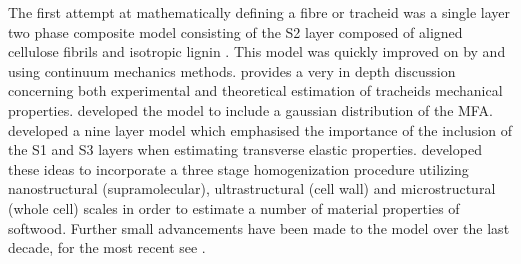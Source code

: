  The first attempt at mathematically defining a fibre or tracheid was a single layer two phase composite model consisting of the S2 layer composed of aligned cellulose fibrils and isotropic lignin \cite{Barber_1964}. This model was quickly improved on by \cite{mark1967cell} and \cite{Cave_1968} using continuum mechanics methods. \cite{mark1967cell} provides a very in depth discussion concerning both experimental and theoretical estimation of tracheids mechanical properties. \cite{Cave_1968} developed the model to include a gaussian distribution of the MFA. \cite{bergander2002cell} developed a nine layer model which emphasised the importance of the inclusion of the S1 and S3 layers when estimating transverse elastic properties. \cite{harrington2002hierarchical} developed these ideas to incorporate a three stage homogenization procedure utilizing nanostructural (supramolecular), ultrastructural (cell wall) and microstructural (whole cell) scales in order to estimate a number of material properties of softwood. Further small advancements have been made to the model over the last decade, for the most recent see \cite{Sun_2014}\cite{Saavedra_Flores_2014}\cite{wang2013gradual}\cite{faisal2013multiscale}.
 
 

 
